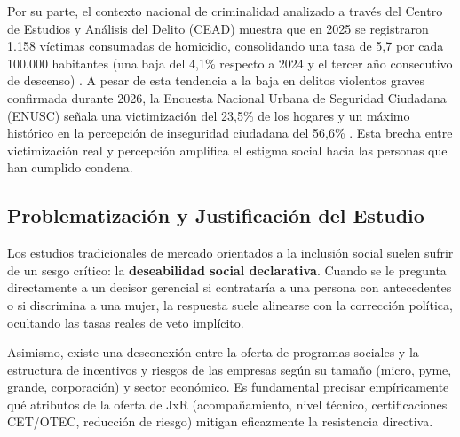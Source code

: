 Por su parte, el contexto nacional de criminalidad analizado a través del Centro de Estudios y Análisis del Delito (CEAD) muestra que en 2025 se registraron 1.158 víctimas consumadas de homicidio, consolidando una tasa de 5,7 por cada 100.000 habitantes (una baja del 4,1\% respecto a 2024 y el tercer año consecutivo de descenso) \parencite{InformesEstadisticosCEAD2026}. A pesar de esta tendencia a la baja en delitos violentos graves confirmada durante 2026, la Encuesta Nacional Urbana de Seguridad Ciudadana (ENUSC) señala una victimización del 23,5\% de los hogares y un máximo histórico en la percepción de inseguridad ciudadana del 56,6\% \parencite{ENUSC2025}. Esta brecha entre victimización real y percepción amplifica el estigma social hacia las personas que han cumplido condena.

\subsection{Problematización y Justificación del Estudio}
Los estudios tradicionales de mercado orientados a la inclusión social suelen sufrir de un sesgo crítico: la \textbf{deseabilidad social declarativa}. Cuando se le pregunta directamente a un decisor gerencial si contrataría a una persona con antecedentes o si discrimina a una mujer, la respuesta suele alinearse con la corrección política, ocultando las tasas reales de veto implícito.

Asimismo, existe una desconexión entre la oferta de programas sociales y la estructura de incentivos y riesgos de las empresas según su tamaño (micro, pyme, grande, corporación) y sector económico. Es fundamental precisar empíricamente qué atributos de la oferta de JxR (acompañamiento, nivel técnico, certificaciones CET/OTEC, reducción de riesgo) mitigan eficazmente la resistencia directiva.
